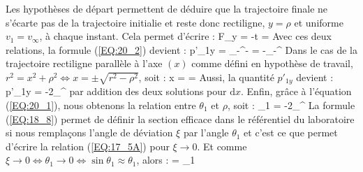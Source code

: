 Les hypoth\`eses de d\'epart permettent de d\'eduire que la trajectoire finale ne s'\'ecarte pas de la trajectoire initialie et reste donc rectiligne, $y = \rho$ et uniforme $v_{1} = v_{\infty}$, \`a chaque instant. Cela permet d'\'ecrire :
\benn
	F_{y} = -t = 
\eenn
Avec ces deux relations, la formule (\ref{EQ:20_2}) devient :
\benn
	p'_{1y} = \int_{-\infty}^{\infty}- = -\int_{-\infty}^{\infty}
\eenn
Dans le cas de la trajectoire rectiligne parall\`ele \`a l'axe $(x)$ comme d\'efini en hypoth\`ese de travail, $r^{2} = x^{2} + \rho^{2} \Leftrightarrow x = \pm\sqrt{r^{2} - \rho^{2}}$, soit :
\benn
	x = \pm{} = \pm{}
\eenn
Aussi, la quantit\'e $p'_{1y}$ devient :
\benn
	p'_{1y} = -2\int_{\rho}^{\infty}
\eenn
par addition des deux solutions pour $\mathrm{d}x$. Enfin, gr\^ace \`a l'\'equation (\ref{EQ:20_1}), nous obtenons la relation entre $\theta_{1}$ et $\rho$, soit :
\be
	\theta_{1} = -2\int_{\rho}^{\infty} \label{EQ:20_3}
\ee
La formule (\ref{EQ:18_8}) permet de d\'efinir la section efficace dans le r\'ef\'erentiel du laboratoire si nous rempla\c{c}ons l'angle de d\'eviation $\xi$ par l'angle $\theta_{1}$ et c'est ce que permet d'\'ecrire la relation (\ref{EQ:17_5A}) pour $\xi \rightarrow 0$. Et comme $\xi \rightarrow 0 \Leftrightarrow \theta_{1} \rightarrow 0 \Leftrightarrow \sin\theta_{1} \approx \theta_{1}$, alors :
\be
	\sigma = \Bigg\lvert {} \Bigg\rvert {}\omega_{1} \label{EQ:20_4}
\ee